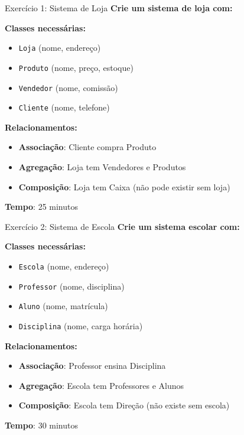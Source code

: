 \documentclass[aspectratio=169]{beamer}
\begin{document}
\begin{frame}{Exercício 1: Sistema de Loja}
\textbf{Crie um sistema de loja com:}

\textbf{Classes necessárias:}
\begin{itemize}
\item \texttt{Loja} (nome, endereço)
\item \texttt{Produto} (nome, preço, estoque)
\item \texttt{Vendedor} (nome, comissão)
\item \texttt{Cliente} (nome, telefone)
\end{itemize}

\textbf{Relacionamentos:}
\begin{itemize}
\item \textbf{Associação}: Cliente compra Produto
\item \textbf{Agregação}: Loja tem Vendedores e Produtos
\item \textbf{Composição}: Loja tem Caixa (não pode existir sem loja)
\end{itemize}

\vspace{0.3cm}
\textbf{Tempo}: 25 minutos
\end{frame}

\begin{frame}{Exercício 2: Sistema de Escola}
\textbf{Crie um sistema escolar com:}

\textbf{Classes necessárias:}
\begin{itemize}
\item \texttt{Escola} (nome, endereço)
\item \texttt{Professor} (nome, disciplina)
\item \texttt{Aluno} (nome, matrícula)
\item \texttt{Disciplina} (nome, carga horária)
\end{itemize}

\textbf{Relacionamentos:}
\begin{itemize}
\item \textbf{Associação}: Professor ensina Disciplina
\item \textbf{Agregação}: Escola tem Professores e Alunos
\item \textbf{Composição}: Escola tem Direção (não existe sem escola)
\end{itemize}

\vspace{0.3cm}
\textbf{Tempo}: 30 minutos
\end{frame}
\end{document}
